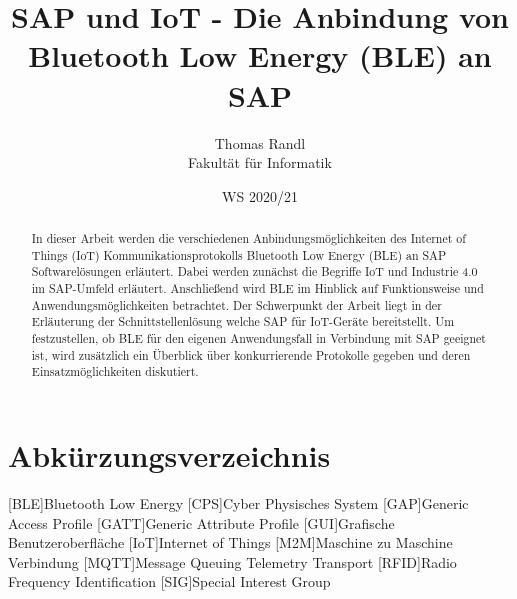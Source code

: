 \documentclass[twoside=false, %
    DIV=15
    ,%
    BCOR=15mm, %
    headinclude=true,
    footinclude=false,
    pagesize,%
    fontsize=12pt,%
    paper=a4,%
    bibliography=totoc,%
    numbers=noenddot
  ]{scrartcl}
\begin{document}
\def\figdir{figures}
\def\tabledir{tables}

\titlehead{
\raggedleft
\texttt{[image: \\figdir/logo-th-rosenheim-2019\_master\_quer\_2c.eps]}
}

\title{
\vspace*{0cm}
SAP und IoT - Die Anbindung von Bluetooth Low Energy (BLE) an SAP
}

\author{
Thomas Randl\\
Fakultät für Informatik}

\date{WS 2020/21}

\maketitle
\thispagestyle{empty}

\begin{abstract}
In dieser Arbeit werden die verschiedenen Anbindungsmöglichkeiten des Internet of Things (IoT) Kommunikationsprotokolls Bluetooth Low Energy (BLE) an SAP Softwarelösungen erläutert. Dabei werden zunächst die Begriffe IoT und Industrie 4.0 im SAP-Umfeld erläutert. Anschließend wird BLE im Hinblick auf Funktionsweise und Anwendungsmöglichkeiten betrachtet.
Der Schwerpunkt der Arbeit liegt in der Erläuterung der Schnittstellenlösung welche SAP für IoT-Geräte bereitstellt. Um festzustellen, ob BLE für den eigenen Anwendungsfall in Verbindung mit SAP geeignet ist, wird zusätzlich ein Überblick über konkurrierende Protokolle gegeben und deren Einsatzmöglichkeiten diskutiert.
\end{abstract}

\newpage

\tableofcontents


\newpage
{}
\listoffigures

\newpage
{}
\section*{Abkürzungsverzeichnis} %
\begin{acronym}[ECUAFFF]
	[BLE]{Bluetooth Low Energy}
	[CPS]{Cyber Physisches System}
	[GAP]{Generic Access Profile}
	[GATT]{Generic Attribute Profile}
	[GUI]{Grafische Benutzeroberfläche}
	[IoT]{Internet of Things}
	[M2M]{Maschine zu Maschine Verbindung}
	[MQTT]{Message Queuing Telemetry Transport}
	[RFID]{Radio Frequency Identification}
	[SIG]{Special Interest Group}
\end{acronym}


\newpage


\pagestyle{headings}



%
\setcounter{page}{4}
\renewcommand\refname{Literaturverzeichnis}


\end{document}
